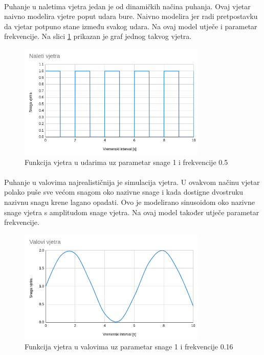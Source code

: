 \documentclass[times, utf8, diplomski]{fer}
\begin{document}
\paragraph{}
Puhanje u naletima vjetra jedan je od dinamičkih načina puhanja. Ovaj vjetar naivno modelira 
vjetre poput udara bure. Naivno modelira jer radi pretpostavku da vjetar potpuno stane 
između svakog udara. Na ovaj model utječe i parametar frekvencije. Na slici \ref{fig:43-2} 
prikazan je graf jednog takvog vjetra.

\begin{figure}[h]
	\centering
	\includegraphics[width=0.8\textwidth]{img/43-2}
	\caption{Funkcija vjetra u udarima uz parametar snage 1 i frekvencije 0.5}
	\label{fig:43-2}
\end{figure}

\paragraph{}
Puhanje u valovima najrealističnija je simulacija vjetra. U ovakvom načinu vjetar polako 
puše sve većom snagom oko nazivne snage i kada dostigne dvostruku nazivnu snagu krene lagano 
opadati. Ovo je modelirano sinusoidom oko nazivne snage vjetra s amplitudom snage vjetra.
Na ovaj model također utječe parametar frekvencije.

\begin{figure}[h]
	\centering
	\includegraphics[width=0.8\textwidth]{img/43-3}
	\caption{Funkcija vjetra u valovima uz parametar snage 1 i frekvencije 0.16}
	\label{fig:43-3}
\end{figure}
\end{document}

